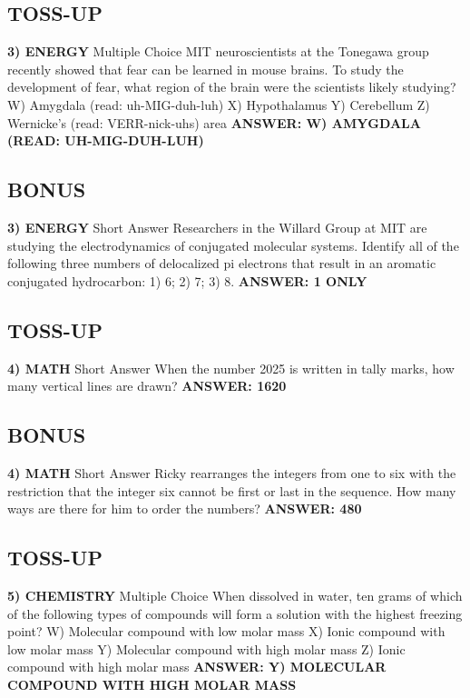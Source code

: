 \documentclass{article}
\begin{document}
\newpage

\subsection*{TOSS-UP}
\textbf{3) ENERGY} Multiple Choice MIT neuroscientists at the Tonegawa group recently showed that fear can be learned in mouse brains.
To study the development of fear, what region of the brain were the scientists likely studying?
W) Amygdala (read: uh-MIG-duh-luh)
X) Hypothalamus
Y) Cerebellum
Z) Wernicke's (read: VERR-nick-uhs) area
\textbf{ANSWER: W) AMYGDALA (READ: UH-MIG-DUH-LUH)}

\subsection*{BONUS}
\textbf{3) ENERGY}
Short Answer Researchers in the Willard Group at MIT are studying the electrodynamics of conjugated molecular systems.
Identify all of the following three numbers of delocalized pi electrons that result in an aromatic conjugated hydrocarbon: 1) 6; 2) 7; 3) 8.
\textbf{ANSWER: 1 ONLY}

\subsection*{TOSS-UP}
\textbf{4) MATH}
Short Answer When the number 2025 is written in tally marks, how many vertical lines are drawn?
\textbf{ANSWER: 1620}

\subsection*{BONUS}
\textbf{4) MATH}
Short Answer Ricky rearranges the integers from one to six with the restriction that the integer six cannot be first or last in the sequence.
How many ways are there for him to order the numbers?
\textbf{ANSWER: 480}

\newpage

\subsection*{TOSS-UP}
\textbf{5) CHEMISTRY}
Multiple Choice
When dissolved in water, ten grams of which of the following types of compounds will form a solution with the highest freezing point?
W) Molecular compound with low molar mass
X) Ionic compound with low molar mass
Y) Molecular compound with high molar mass
Z) Ionic compound with high molar mass
\textbf{ANSWER: Y) MOLECULAR COMPOUND WITH HIGH MOLAR MASS}
\end{document}
